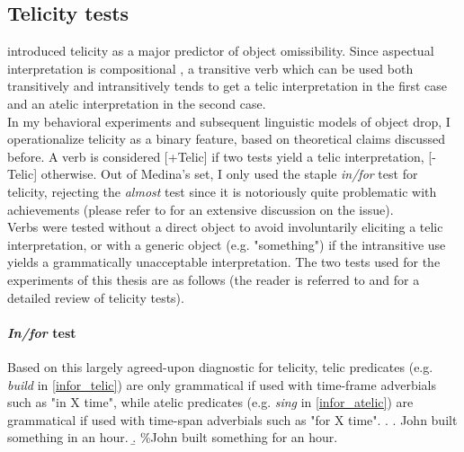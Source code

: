 \subsection{Telicity tests}
 introduced telicity as a major predictor of object omissibility. Since aspectual interpretation is compositional \parencite[14]{Olsen1997}, a transitive verb which can be used both transitively and intransitively tends to get a telic interpretation in the first case and an atelic interpretation in the second case.\\ 
In my behavioral experiments and subsequent linguistic models of object drop, I operationalize telicity as a binary feature, based on theoretical claims discussed before. A verb is considered [+Telic] if two tests yield a telic interpretation, [-Telic] otherwise. Out of Medina's set, I only used the staple \textit{in/for} test for telicity, rejecting the \textit{almost} test since it is notoriously quite problematic with achievements (please refer to \textcite{bertinetto-delfitto2000aspect} for an extensive discussion on the issue).\\
Verbs were tested without a direct object to avoid involuntarily eliciting a telic interpretation, or with a generic object (e.g. "something") if the intransitive use yields a grammatically unacceptable interpretation. The two tests used for the experiments of this thesis are as follows (the reader is referred to \textcite{Borik2006} and \textcite{Liu2014} for a detailed review of telicity tests).

\paragraph{\textit{In/for} test} Based on this largely agreed-upon diagnostic for telicity, telic predicates (e.g. \textit{build} in \ref{infor_telic}) are only grammatical if used with time-frame adverbials such as "in X time", while atelic predicates (e.g. \textit{sing} in \ref{infor_atelic}) are grammatical if used with time-span adverbials such as "for X time".
\ex. \label{infor_telic} \a. John built something in an hour.
\b. \%John built something for an hour.

